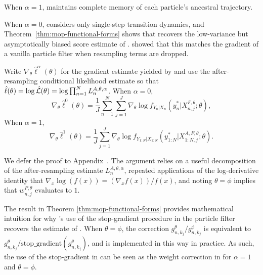 When $\alpha=1$,  maintains complete memory of each particle's ancestral trajectory.
\newEdit{\editPoyiadjisCorrespondence}

When $\alpha=0$,  considers only single-step transition dynamics, and Theorem~\ref{thm:mop-functional-forms} shows that  recovers the low-variance but asymptotically biased score estimate of \cite{naesseth18}.
\cite{scibior21} showed that this matches the gradient of a vanilla particle filter when resampling terms are dropped. 

\begin{thm}
    \label{thm:mop-functional-forms}
    Write $\nabla_\theta \hat\ell^\alpha(\theta)$ for the gradient estimate yielded by  
    and use the after-resampling conditional likelihood estimate so that $\hat{\ell}(\theta)= \log \hat{\mathcal{L}}(\theta) = \log \prod_{n=1}^N L_n^{A, \theta, \alpha}$. When $\alpha=0$,
    \begin{equation} \nonumber %
        \nabla_\theta \hat\ell^0(\theta) 
        = \frac{1}{J} \sum_{n=1}^N \sum_{j=1}^J \nabla_\theta \log f_{Y_n|X_{n}}\left(y_n^*|X_{n,j}^{F, \theta}; \theta\right),
    \end{equation}
    \newEdit{\editTheoremOne}
    When $\alpha=1$,
    \begin{equation} \nonumber %
        \nabla_\theta \hat{\ell}^1(\theta) 
        = \frac{1}{J}\sum_{j=1}^J \nabla_\theta \log f_{Y_{1:N}|X_{1:N}}\left(y_{1:N}^* | X_{1:N,j}^{A,F,\theta}; \theta \right).
    \end{equation}
    \newEdit{\editAncestorDefinition}
\end{thm}

We defer the proof to Appendix~\suppSecProofFunctionalForms. 
The argument relies on a useful decomposition of the after-resampling estimate $L_n^{A,\theta,\alpha}$, repeated applications of the log-derivative identity that $\nabla_x \log(f(x)) = (\nabla_x f(x))/f(x)$, and noting $\theta=\phi$ implies that $w_{n,j}^{P,\theta}$ evaluates to $1$. 

The result in Theorem \ref{thm:mop-functional-forms} provides mathematical intuition for why \cite{scibior21}'s use of the stop-gradient procedure in the particle filter recovers the estimate of \cite{poyiadjis11}.
When $\theta=\phi$, the correction $g_{n,k_j}^\theta/g_{n,k_j}^\phi$ is equivalent to $g_{n,k_j}^\theta / \text{stop\_gradient}(g_{n,k_j}^\theta)$, and is implemented in this way in practice.
As such, the use of the stop-gradient in \cite{scibior21} can be seen as the weight correction in  for $\alpha=1$ and $\theta=\phi$.


